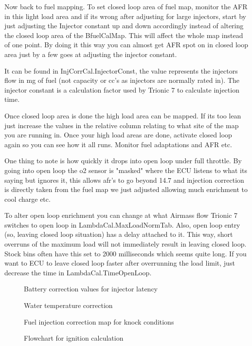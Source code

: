 \documentclass[11pt,a4paper]{book}
\begin{document}
Now back to fuel mapping. To set closed loop area of fuel map, monitor the AFR in this light load area
and if its wrong after adjusting for large injectors, start by just adjusting the Injector constant up and
down accordingly instead of altering the closed loop area of the BfuelCalMap. This will affect the
whole map instead of one point. By doing it this way you can almost get AFR spot on in closed loop
area just by a few goes at adjusting the injector constant.

It can be found in InjCorrCal.InjectorConst, the value represents the injectors flow in mg of fuel (not
capacity or cc's as injectors are normally rated in). The injector constant is a calculation factor used by
Trionic 7 to calculate injection time.

Once closed loop area is done the high load area can be mapped. If its too lean just increase the
values in the relative column relating to what site of the map you are running in. Once your high load
areas are done, activate closed loop again so you can see how it all runs. Monitor fuel adaptations and
AFR etc.

One thing to note is how quickly it drops into open loop under full throttle.
By going into open loop the o2 sensor is "masked" where the ECU listens to what its saying but
ignores it, this allows afr's to go beyond 14.7 and injection correction is directly taken from the fuel
map we just adjusted allowing much enrichment to cool charge etc.

To alter open loop enrichment you can change at what Airmass flow Trionic 7 switches to open loop in
LambdaCal.MaxLoadNormTab. Also, open loop entry (so, leaving closed loop situation) has a delay
attached to it. This way, short overruns of the maximum load will not immediately result in leaving
closed loop. Stock bins often have this set to 2000 milliseconds which seems quite long. If you want
to ECU to leave closed loop faster after overrunning the load limit, just decrease the time in
LambdaCal.TimeOpenLoop.
\begin{figure}[<+htpb+>]
    \centering
    \missingfigure{}
    \caption{Battery correction values for injector latency}
    \label{fig:}
\end{figure}

\begin{figure}[<+htpb+>]
    \centering
    \missingfigure{}
    \caption{Water temperature correction}
    \label{fig:}
\end{figure}


\begin{figure}[<+htpb+>]
    \centering
    \missingfigure{}
    \caption{Fuel injection correction map for knock conditions}
    \label{fig:}
\end{figure}
\begin{figure}[<+htpb+>]
    \centering
    
    \caption{Flowchart for ignition calculation}
    \label{fig:}
\end{figure}
\end{document}
